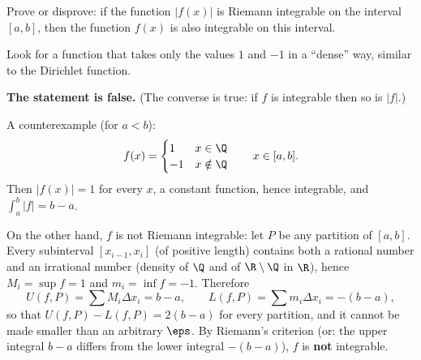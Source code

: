 
\begin{question}
Prove or disprove: if the function $|f(x)|$ is Riemann integrable on the interval $[a,b]$, then the function $f(x)$ is also integrable on this interval.
\end{question}

\begin{hint}
Look for a function that takes only the values $1$ and $-1$ in a ``dense'' way, similar to the Dirichlet function.
\end{hint}

\begin{solution}
\textbf{The statement is false.} (The converse is true: if $f$ is integrable then so is $|f|$.)

A counterexample (for $a<b$):
\[ f(x)=\begin{cases}1 & x\in\Q\\ -1 & x\notin\Q\end{cases}\qquad x\in[a,b]. \]
Then $|f(x)|=1$ for every $x$, a constant function, hence integrable, and $\int_a^b|f|=b-a$.

On the other hand, $f$ is not Riemann integrable: let $P$ be any partition of $[a,b]$. Every subinterval $[x_{i-1},x_i]$ (of positive length) contains both a rational number and an irrational number (density of $\Q$ and of $\R\setminus\Q$ in $\R$), hence $M_i=\sup f=1$ and $m_i=\inf f=-1$. Therefore
\[ U(f,P)=\sum M_i\Delta x_i=b-a,\qquad L(f,P)=\sum m_i\Delta x_i=-(b-a), \]
so that $U(f,P)-L(f,P)=2(b-a)$ for every partition, and it cannot be made smaller than an arbitrary $\eps$. By Riemann's criterion (or: the upper integral $b-a$ differs from the lower integral $-(b-a)$), $f$ is \textbf{not} integrable.
\end{solution}
